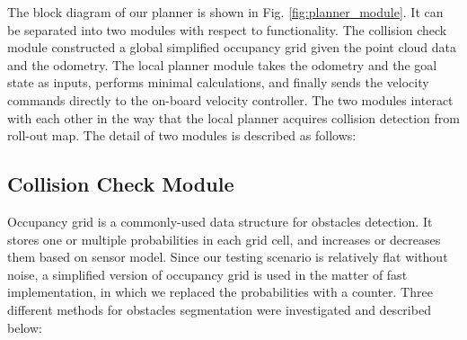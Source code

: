 \documentclass[../thesis.tex]{subfiles}
\begin{document}
The block diagram of our planner is shown in Fig. \ref{fig:planner_module}. It can be separated into two modules with respect to functionality. The collision check module constructed a global simplified occupancy grid given the point cloud data and the odometry. The local planner module takes the odometry and the goal state as inputs, performs minimal calculations, and finally sends the velocity commands directly to the on-board velocity controller.
The two modules interact with each other in the way that the local planner acquires collision detection from roll-out map.
The detail of two modules is described as follows:
 
 
\subsection{Collision Check Module}
 
Occupancy grid is a commonly-used data structure for obstacles detection. It stores one or multiple probabilities in each grid cell, and increases or decreases them based on sensor model. Since our testing scenario is relatively flat without noise, a simplified version of occupancy grid is used in the matter of fast implementation, in which we replaced the probabilities with a counter. Three different methods for obstacles segmentation were investigated and described below:
 
\end{document}
